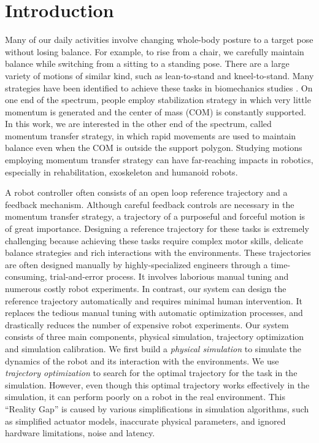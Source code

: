 \section{Introduction}

Many of our daily activities involve changing whole-body posture to a target pose without losing balance. For example, to rise from a chair, we carefully maintain balance while switching from a sitting to a standing pose. There are a large variety of motions of similar kind, such as lean-to-stand and kneel-to-stand. Many strategies have been identified to achieve these tasks in biomechanics studies \cite{schenkman:1990,riley:1991,hughes:1994,hughes:1996}. On one end of the spectrum, people employ stabilization strategy in which very little momentum is generated and the center of mass (COM) is constantly supported. In this work, we are interested in the other end of the spectrum, called momentum transfer strategy, in which rapid movements are used to maintain balance even when the COM is outside the support polygon. Studying motions employing momentum transfer strategy can have far-reaching impacts in robotics, especially in rehabilitation, exoskeleton and humanoid robots. 

A robot controller often consists of an open loop reference trajectory and a feedback mechanism. Although careful feedback controls are necessary in the momentum transfer strategy, a trajectory of a purposeful and forceful motion is of great importance. Designing a reference trajectory for these tasks is extremely challenging because achieving these tasks require complex motor skills, delicate balance strategies and rich interactions with the environments. These trajectories are often designed manually by highly-specialized engineers through a time-consuming, trial-and-error process. It involves laborious manual tuning and numerous costly robot experiments. In contrast, our system can design the reference trajectory automatically and requires minimal human intervention. It replaces the tedious manual tuning with automatic optimization processes, and drastically reduces the number of expensive robot experiments. Our system consists of three main components, physical simulation, trajectory optimization and simulation calibration. We first build a \emph{physical simulation} to simulate the dynamics of the robot and its interaction with the environments. We use \emph{trajectory optimization} to search for the optimal trajectory for the task in the simulation. However, even though this optimal trajectory works effectively in the simulation, it can perform poorly on a robot in the real environment. This ``Reality Gap'' \cite{Jakobi95} is caused by various simplifications in simulation algorithms, such as simplified actuator models, inaccurate physical parameters, and ignored hardware limitations, noise and latency. 

